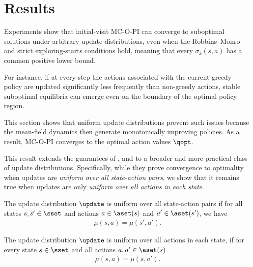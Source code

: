 \section{Results}
\label{sec: results}




Experiments show that initial-visit MC-O-PI can converge to suboptimal solutions under arbitrary update distributions, even when the Robbins–Monro 
and strict exploring-starts conditions hold, meaning that every $\sigma_k(s,a)$ has a common positive lower bound.


For instance, if at every step the actions associated with the current greedy policy are updated significantly less frequently than non-greedy actions, stable suboptimal equilibria can emerge even on the boundary of the optimal policy region.

This section shows that uniform update distributions prevent such issues because the mean-field dynamics then generate monotonically improving policies.
As a result, MC-O-PI converges to the optimal action values $\qopt$.

This result extends the guarantees of \citet{Tsitsiklis2002OnIteration}, \citet{Chen2018OnProblem} and \citet{Liu2021OnStarts} to a broader and more practical class of update distributions.
Specifically, while they prove convergence to optimality when updates are \textit{uniform over all state-action pairs}, we show that it remains true when updates are only \textit{uniform over all actions in each state}.

\begin{definition}
\label{asp: unbiased tsitsiklis}
The update distribution $\update$ is uniform over all state-action pairs
if for all states $s, s' \in \sset$ and actions $a \in \aset(s)$ and $a' \in \aset(s')$, we have
\begin{align*}
    \mu(s, a) = \mu(s', a') .
\end{align*}
\end{definition}

\begin{definition}
\label{asp: unbiased over policies}
The update distribution $\update$ is uniform over all actions in each state,
if for every state $s \in \sset$ and all actions $a, a' \in \aset(s)$
\begin{align*}
    \mu(s, a) = \mu(s, a') .
\end{align*}
\end{definition}

